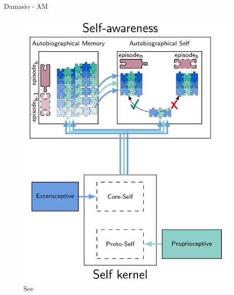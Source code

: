 \documentclass[handout]{beamer}
\begin{document}
\begin{frame}{Damasio - AM}
	\begin{figure}
		\includegraphics[scale=0.3]{regazzoni-2020-multi-sensorial-generative-and-descriptive-self-awareness-models-for-autonomous-systems-fig-4.png}
		\caption{See \cite{regazzoni-2020-multi-sensorial-generative-and-descriptive-self-awareness-models-for-autonomous-systems}}
	\end{figure}
\end{frame}
\end{document}
